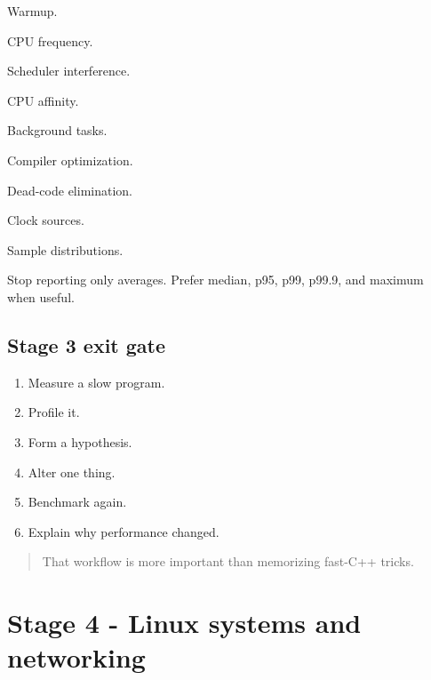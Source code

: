 \documentclass[11pt,letterpaper]{article}
\begin{document}
\begin{topics}

\item Warmup.

\item CPU frequency.

\item Scheduler interference.

\item CPU affinity.

\item Background tasks.

\item Compiler optimization.

\item Dead-code elimination.

\item Clock sources.

\item Sample distributions.

\end{topics}

Stop reporting only averages. Prefer median, p95, p99, p99.9, and maximum when useful.

\subsection*{Stage 3 exit gate}

\begin{enumerate}

\item Measure a slow program.

\item Profile it.

\item Form a hypothesis.

\item Alter one thing.

\item Benchmark again.

\item Explain why performance changed.

\end{enumerate}

\begin{quote}
That workflow is more important than memorizing fast-C++ tricks.
\end{quote}

\section{Stage 4 - Linux systems and networking}\label{sec:8}
\end{document}
